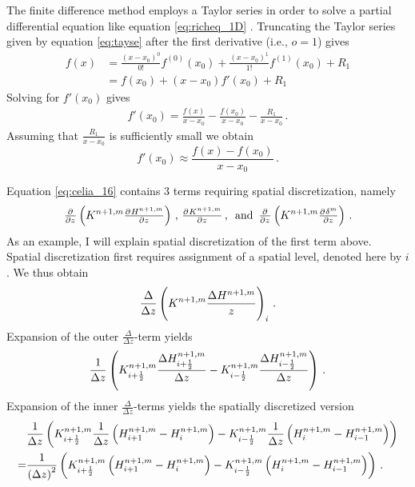 The finite difference method employs a Taylor series in order to solve a partial differential equation like equation \eqref{eq:richeq_1D} \parencite{fornberg_finite_2011}.  Truncating the Taylor series given by equation \eqref{eq:tayse} after the first derivative (i.e., $o = 1$) gives
\begin{align*}
  f(x) &= \frac{(x - x_0)^0}{0!}f^{(0)}(x_0) + \frac{(x - x_0)^1}{1!}f^{(1)}(x_0) + R_1 \\
       &= f(x_0) + (x - x_0)f'(x_0) + R_1
\end{align*}
Solving for $f'(x_0)$ gives
\begin{align*}
  f'(x_0) = \frac{f(x)}{x - x_0} - \frac{f(x_0)}{x - x_0} - \frac{R_1}{x - x_0} \, .
\end{align*}
Assuming that $\frac{R_1}{x - x_0}$ is sufficiently small we obtain
\begin{equation}
  \label{eq:fidifmeth}
  f'(x_0) \approx \frac{f(x) - f(x_0)}{x - x_0} \, .
\end{equation}

Equation \eqref{eq:celia_16} contains 3 terms requiring spatial discretization, namely
\begin{equation*}
  \pd{}{z} \del{ K^{n+1,m} \pd{H^{n+1,m}}{z} } \, , \, \pd{K^{n+1,m}}{z} \, , \, \text{ and } \, \pd{}{z} \del{ K^{n+1,m} \pd{\delta^m}{z} } \, .
\end{equation*}
As an example, I will explain spatial discretization of the first term above.  Spatial discretization first requires assignment of a spatial level, denoted here by $i$.  We thus obtain
\begin{equation*}
  \frac{\Delta}{\Delta z} \del{ K^{n+1,m}\frac{\Delta H^{n+1,m}}{z} }_i \, .
\end{equation*}
Expansion of the outer $\frac{\Delta}{\Delta z}$-term yields
\begin{equation*}
  \frac{1}{\Delta z} \del{ K_{i+\frac{1}{2}}^{n+1,m}\frac{\Delta H_{i+\frac{1}{2}}^{n+1,m}}{\Delta z} - K_{i-\frac{1}{2}}^{n+1,m}\frac{\Delta H_{i-\frac{1}{2}}^{n+1,m}}{\Delta z} } \, .
\end{equation*}
Expansion of the inner $\frac{\Delta}{\Delta z}$-terms yields the spatially discretized version
\begin{align*}
  &\frac{1}{\Delta z} \del{ K_{i+\frac{1}{2}}^{n+1,m}\frac{1}{\Delta z} \del{ H_{i+1}^{n+1,m} - H_{i}^{n+1,m} } - K_{i-\frac{1}{2}}^{n+1,m}\frac{1}{\Delta z} \del{ H_{i}^{n+1,m} - H_{i-1}^{n+1,m} } } \\
  = &\frac{1}{\del{ \Delta z }^2} \del{ K_{i+\frac{1}{2}}^{n+1,m} \del{ H_{i+1}^{n+1,m} - H_{i}^{n+1,m} } - K_{i-\frac{1}{2}}^{n+1,m} \del{ H_{i}^{n+1,m} - H_{i-1}^{n+1,m} } } \, .
\end{align*}

